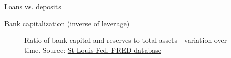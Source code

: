 \begin{frame}{Loans vs. deposits}

\end{frame}



\begin{frame}{Bank capitalization (inverse of leverage)}

\begin{figure}
\begin{center}


\caption{\label{fig:L4_US_bank_capital_asset_ratio} Ratio of bank capital and reserves to total assets - variation over time. Source: \href{https://fred.stlouisfed.org/series/DDSI03USA156NWDB}{St Louis Fed. FRED database}}
\end{center}
\end{figure}

\end{frame}

